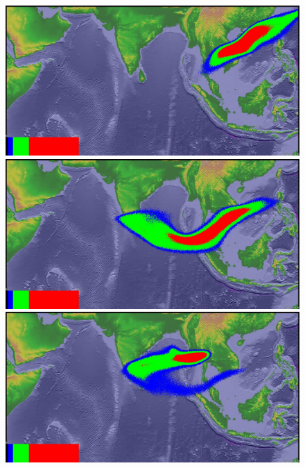 \begin{figure}[!htb]
    \centering
    \begin{minipage}{.245\textwidth}
        \centering
        \includegraphics[width=0.99 \textwidth]{Chapter-7/Figures/bent-55hr-ash-MaxH10000}
    \end{minipage}%
    \begin{minipage}{.245 \textwidth}
        \centering
        \includegraphics[width=0.99 \textwidth]{Chapter-7/Figures/bent-55hr-ash-MaxH20000}
    \end{minipage}%
    \begin{minipage}{.245 \textwidth}
        \centering
        \includegraphics[width=0.99 \textwidth]{Chapter-7/Figures/bent-55hr-ash-MaxH30000}

\end{minipage}
\end{figure}
